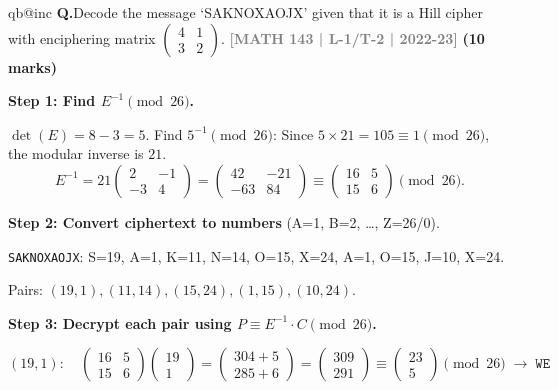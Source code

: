 \documentclass[12pt,a3paper]{article}
\makeatletter
\newcommand{\yr}[1]{\hfill\textcolor{gray}{\small\textbf{[#1]}}}
\newcommand{\mk}[1]{\textcolor{orange!70!black}{\small\textbf{(#1 marks)}}}
\newcounter{qnum}
\newcommand{\Q}[1]{%
  \csname qb@inc\endcsname
  \needspace{4\baselineskip}
  \refstepcounter{qnum}
  \vspace{6pt}
  \noindent\textbf{Q\theqnum.}\enspace #1\par
}
\makeatother
\begin{document}
\Q{Decode the message `SAKNOXAOJX' given that it is a Hill cipher with enciphering matrix $\begin{pmatrix} 4 & 1 \\ 3 & 2 \end{pmatrix}$.
\yr{MATH 143 | L-1/T-2 | 2022-23} \mk{10}}

 
\begin{tcolorbox}[enhanced,breakable,
  colback=cA!4,colframe=cA,boxrule=0.8pt,arc=5pt,
  title={\textbf{Answer --- Decode \texttt{SAKNOXAOJX},
    $E=\begin{pmatrix}4&1\\3&2\end{pmatrix}$ (A=1)}},
  fonttitle=\bfseries\color{white},colbacktitle=cA]

\textbf{Step 1: Find $E^{-1} \pmod{26}$.}

$\det(E) = 8-3=5$. Find $5^{-1}\pmod{26}$: Since $5\times21=105 \equiv 1 \pmod{26}$, the modular inverse is $21$.
\[
E^{-1} = 21\begin{pmatrix}2&-1\\-3&4\end{pmatrix}
= \begin{pmatrix}42&-21\\-63&84\end{pmatrix}
\equiv \begin{pmatrix}16&5\\15&6\end{pmatrix}\pmod{26}.
\]

\medskip
\textbf{Step 2: Convert ciphertext to numbers} (A=1, B=2, \ldots, Z=26/0).

\texttt{SAKNOXAOJX}: S=19, A=1, K=11, N=14, O=15, X=24, A=1, O=15, J=10, X=24.

Pairs: $(19,1), (11,14), (15,24), (1,15), (10,24)$.

\medskip
\textbf{Step 3: Decrypt each pair using $P \equiv E^{-1} \cdot C \pmod{26}$.}

\[
(19,1):\quad
\begin{pmatrix}16&5\\15&6\end{pmatrix}\begin{pmatrix}19\\1\end{pmatrix}
=\begin{pmatrix}304+5\\285+6\end{pmatrix}
=\begin{pmatrix}309\\291\end{pmatrix}
\equiv\begin{pmatrix}23\\5\end{pmatrix}\pmod{26}
\;\to\;\texttt{WE}
\]


\end{tcolorbox}
\end{document}
